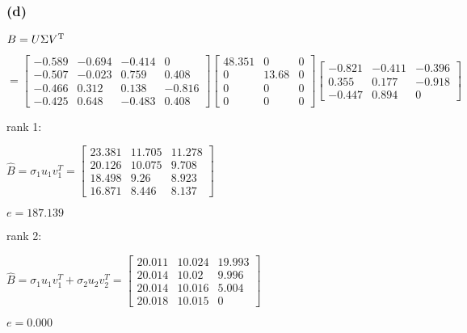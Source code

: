 \documentclass{article}
\begin{document}
\subsubsection*{(d)}
$B=U \Sigma V^{\rm T}$\par\indent
\par
$=\begin{bmatrix}
-0.589 &-0.694 &-0.414 &0\\
-0.507 &-0.023 &0.759  &0.408\\
-0.466 &0.312  &0.138 &-0.816\\
-0.425  &0.648 &-0.483  &0.408
\end{bmatrix}
\begin{bmatrix}
48.351  &0     &0\\
0  &13.68     &0\\
0  &0     &0\\
0  &0     &0
\end{bmatrix}
\begin{bmatrix}
-0.821 &-0.411 &-0.396\\
0.355  &0.177 &-0.918\\
-0.447  &0.894  &0
\end{bmatrix}$\par\indent
\par
rank 1:\par\indent
\par
$\hat{B}=\sigma_{1}u_{1}v_{1}^{T}=
\begin{bmatrix}
23.381 &11.705 &11.278\\
20.126 &10.075  &9.708\\
18.498  &9.26   &8.923\\
16.871  &8.446  &8.137
\end{bmatrix}$\par\indent
\par
$e=187.139$\par\indent
\par
rank 2:\par\indent
\par
$\hat{B}=\sigma_{1}u_{1}v_{1}^{T}+\sigma_{2}u_{2}v_{2}^{T}=
\begin{bmatrix}
20.011 &10.024 &19.993\\
20.014 &10.02   &9.996\\
20.014 &10.016  &5.004\\
20.018 &10.015 &0   
\end{bmatrix}$\par\indent
\par
$e=0.000$
\end{document}
